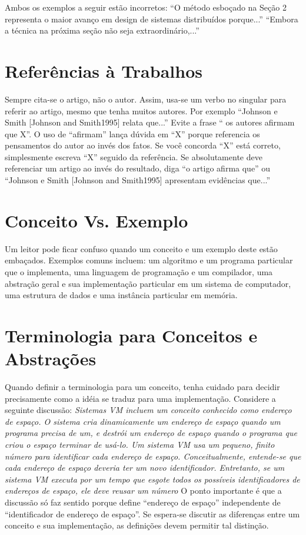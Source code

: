 Ambos os exemplos a seguir est\~{a}o incorretos: ``O m\'{e}todo esbo\c{c}ado na Se\c{c}\~{a}o 2 representa o maior avan\c{c}o em design de sistemas distribu\'{i}dos porque...'' 
``Embora a t\'{e}cnica na pr\'{o}xima se\c{c}\~{a}o n\~{a}o seja extraordin\'{a}rio,...''

\section{Referências à Trabalhos}

Sempre cita-se o artigo, n\~{a}o o autor. Assim, usa-se um verbo no singular para referir ao artigo, mesmo que tenha muitos autores. Por exemplo ``Johnson e Smith [Johnson and Smith1995] relata que...''
Evite a frase `` os autores afirmam que X''. O uso de ``afirmam'' lan\c{c}a d\'{u}vida em ``X'' porque referencia os pensamentos do autor ao inv\'{e}s dos fatos. Se você concorda ``X'' est\'{a} correto, simplesmente escreva ``X'' seguido da referência. Se absolutamente deve referenciar um artigo ao inv\'{e}s do resultado, diga ``o artigo afirma que'' ou ``Johnson e Smith [Johnson and Smith1995] apresentam evidências que...''

\section{Conceito Vs. Exemplo}

Um leitor pode ficar confuso quando um conceito e um exemplo deste est\~{a}o emba\c{c}ados. 
Exemplos comuns incluem: um algoritmo e um programa particular que o implementa, uma linguagem de programa\c{c}\~{a}o e um compilador, uma abstra\c{c}\~{a}o geral e sua implementa\c{c}\~{a}o 
particular em um sistema de computador, uma estrutura de dados e uma inst\^{a}ncia particular em mem\'{o}ria.

\section{Terminologia para Conceitos e Abstra\c{c}\~{o}es}

Quando definir a terminologia para um conceito, tenha cuidado para decidir precisamente como a id\'{e}ia se traduz para uma implementa\c{c}\~{a}o. Considere a seguinte discuss\~{a}o:
\textit{Sistemas VM incluem um conceito conhecido como endere\c{c}o de espa\c{c}o. O sistema cria dinamicamente um endere\c{c}o de espa\c{c}o quando um programa precisa de um, e destr\'{o}i um endere\c{c}o de espa\c{c}o 
quando o programa que criou o espa\c{c}o terminar de us\'{a}-lo. Um sistema VM usa um pequeno, finito n\'{u}mero para identificar cada endere\c{c}o de espa\c{c}o. 
Conceitualmente, entende-se que cada endere\c{c}o de espa\c{c}o deveria ter um novo identificador. Entretanto, se um sistema VM executa por um tempo que esgote todos os poss\'{i}veis identificadores de endere\c{c}os de espa\c{c}o, 
ele deve reusar um n\'{u}mero}
O ponto importante \'{e} que a discuss\~{a}o s\'{o} faz sentido porque define ``endere\c{c}o de espa\c{c}o'' independente de ``identificador de endere\c{c}o de espa\c{c}o''. 
Se espera-se discutir as diferen\c{c}as entre um conceito e sua implementa\c{c}\~{a}o, as defini\c{c}\~{o}es devem permitir tal distin\c{c}\~{a}o.


